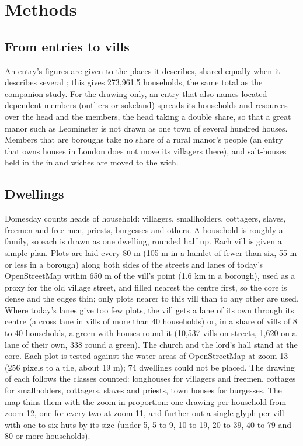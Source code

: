 \documentclass[11pt,a4paper]{article}
\begin{document}
\section{Methods}
\subsection{From entries to vills}
An entry's figures are given to the places it describes, shared equally when it describes several \cite{destiny}; this gives 273,961.5 households, the same total as the companion study. For the drawing only, an entry that also names located dependent members (outliers or sokeland) spreads its households and resources over the head and the members, the head taking a double share, so that a great manor such as Leominster is not drawn as one town of several hundred houses. Members that are boroughs take no share of a rural manor's people (an entry that owns houses in London does not move its villagers there), and salt-houses held in the inland wiches are moved to the wich.

\subsection{Dwellings}
Domesday counts heads of household: villagers, smallholders, cottagers, slaves, freemen and free men, priests, burgesses and others. A household is roughly a family, so each is drawn as one dwelling, rounded half up. Each vill is given a simple plan. Plots are laid every 80 m (105 m in a hamlet of fewer than six, 55 m or less in a borough) along both sides of the streets and lanes of today's OpenStreetMap within 650 m of the vill's point (1.6 km in a borough), used as a proxy for the old village street, and filled nearest the centre first, so the core is dense and the edges thin; only plots nearer to this vill than to any other are used. Where today's lanes give too few plots, the vill gets a lane of its own through its centre (a cross lane in vills of more than 40 households) or, in a share of vills of 8 to 40 households, a green with houses round it (10,537 vills on streets, 1,620 on a lane of their own, 338 round a green). The church and the lord's hall stand at the core. Each plot is tested against the water areas of OpenStreetMap at zoom 13 (256 pixels to a tile, about 19 m); 74 dwellings could not be placed. The drawing of each follows the classes counted: longhouses for villagers and freemen, cottages for smallholders, cottagers, slaves and priests, town houses for burgesses. The map thins them with the zoom in proportion: one drawing per household from zoom 12, one for every two at zoom 11, and further out a single glyph per vill with one to six huts by its size (under 5, 5 to 9, 10 to 19, 20 to 39, 40 to 79 and 80 or more households).
\end{document}
